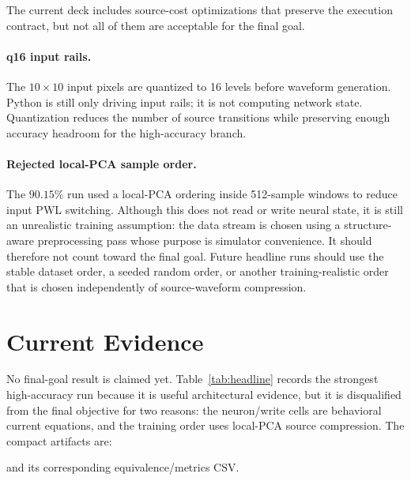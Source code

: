 \documentclass[11pt]{article}
\begin{document}
The current deck includes source-cost optimizations that preserve the execution
contract, but not all of them are acceptable for the final goal.

\paragraph{q16 input rails.}
The \(10\times10\) input pixels are quantized to 16 levels before waveform
generation.  Python is still only driving input rails; it is not computing
network state.  Quantization reduces the number of source transitions while
preserving enough accuracy headroom for the high-accuracy branch.

\paragraph{Rejected local-PCA sample order.}
The \(90.15\%\) run used a local-PCA ordering inside 512-sample windows to
reduce input PWL switching.  Although this does not read or write neural state,
it is still an unrealistic training assumption: the data stream is chosen using
a structure-aware preprocessing pass whose purpose is simulator convenience.
It should therefore not count toward the final goal.  Future headline runs
should use the stable dataset order, a seeded random order, or another
training-realistic order that is chosen independently of source-waveform
compression.

\section{Current Evidence}

No final-goal result is claimed yet.  Table~\ref{tab:headline} records the
strongest high-accuracy run because it is useful architectural evidence, but it
is disqualified from the final objective for two reasons: the neuron/write cells
are behavioral current equations, and the training order uses local-PCA source
compression.  The compact artifacts are:
\begin{center}
\small
{}
\end{center}
and its corresponding equivalence/metrics CSV.
\end{document}
